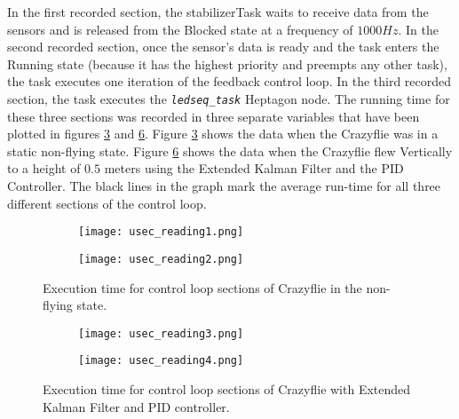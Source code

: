 \documentclass[10pt, a4paper]{article}
\newcommand{\textFunc}[1]{\texttt{\textit{#1}}}
\begin{document}
    In the first recorded section, the  stabilizerTask waits to receive data from the sensors and is released from the Blocked state at a frequency of $1000Hz$. In the second recorded section, once the sensor's data is ready and the task enters the Running state (because it has the highest priority and preempts any other task), the task executes one iteration of the feedback control loop. In the third recorded section, the task executes the \textFunc{ledseq\_task} Heptagon node. The running time for these three sections was recorded in three separate variables that have been plotted in figures \ref{figure:usec_readings1} and \ref{figure:usec_readings2}. Figure \ref{figure:usec_readings1} shows the data when the Crazyflie was in a static non-flying state. Figure \ref{figure:usec_readings2} shows the data when the Crazyflie flew Vertically to a height of $0.5$ meters using the Extended Kalman Filter and the PID Controller. The black lines in the graph mark the average run-time for all three different sections of the control loop.

    \begin{figure}[hbt!]
        \centering
        \begin{subfigure}[b]{0.48\textwidth}
            \centering
            \texttt{[image: usec\_reading1.png]}
            \label{figure:usec_reading1}
        \end{subfigure}
        \begin{subfigure}[b]{0.48\textwidth}
            \centering
            \texttt{[image: usec\_reading2.png]}
            \label{figure:usec_reading2}
        \end{subfigure}
        \caption{Execution time for control loop sections of Crazyflie in the non-flying state.}
        \label{figure:usec_readings1}
    \end{figure}

    \begin{figure}[hbt!]
        \centering
        \begin{subfigure}[b]{0.48\textwidth}
            \centering
            \texttt{[image: usec\_reading3.png]}
            \label{figure:usec_reading3}
        \end{subfigure}
        \begin{subfigure}[b]{0.48\textwidth}
            \centering
            \texttt{[image: usec\_reading4.png]}
            \label{figure:usec_reading4}
        \end{subfigure}
        \caption{Execution time for control loop sections of Crazyflie with Extended Kalman Filter and PID controller.}
        \label{figure:usec_readings2}
    \end{figure}
\end{document}

